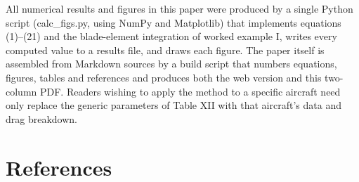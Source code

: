\documentclass[10pt,a4paper,twocolumn]{article}
\begin{document}
All numerical results and figures in this paper were produced by a
single Python script (calc\_figs.py, using NumPy and Matplotlib) that
implements equations (1)--(21) and the blade-element integration of
worked example I, writes every computed value to a results file, and
draws each figure. The paper itself is assembled from Markdown sources
by a build script that numbers equations, figures, tables and references
and produces both the web version and this two-column PDF. Readers
wishing to apply the method to a specific aircraft need only replace the
generic parameters of Table XII with that aircraft's data and drag
breakdown.

\hypertarget{references}{%
\section*{References}\label{references}}
\end{document}
